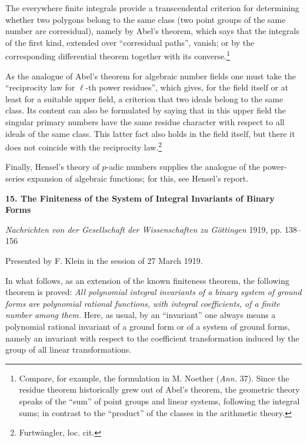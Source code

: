\documentclass[11pt]{article}
\providecommand{\frS}{\mathfrak S}
\begin{document}
The everywhere finite integrals provide a transcendental criterion for determining whether two polygons belong to the same class (two point groups of the same number are corresidual), namely by Abel's theorem, which says that the integrals of the first kind, extended over ``corresidual paths'', vanish; or by the corresponding differential theorem together with its converse.\footnote{Compare, for example, the formulation in M. Noether (\emph{Ann.} 37). Since the residue theorem historically grew out of Abel's theorem, the geometric theory speaks of the ``sum'' of point groups and linear systems, following the integral sums; in contrast to the ``product'' of the classes in the arithmetic theory.}

As the analogue of Abel's theorem for algebraic number fields one must take the ``reciprocity law for \(\ell\)-th power residues'', which gives, for the field itself or at least for a suitable upper field, a criterion that two ideals belong to the same class. Its content can also be formulated by saying that in this upper field the singular primary numbers have the same residue character with respect to all ideals of the same class. This latter fact also holds in the field itself, but there it does not coincide with the reciprocity law.\footnote{Furtwängler, loc. cit.}

Finally, Hensel's theory of \(p\)-adic numbers supplies the analogue of the power-series expansion of algebraic functions; for this, see Hensel's report.


\providecommand{\frH}{\mathfrak H}
\providecommand{\frK}{\mathfrak K}
\providecommand{\frM}{\mathfrak M}
\providecommand{\frN}{\mathfrak N}
\providecommand{\frG}{\mathfrak G}
\providecommand{\frS}{\mathfrak S}
\providecommand{\tmod}[1]{\;(\operatorname{mod} #1)}

\clearpage
\begin{center}
{\Large\bfseries 15. The Finiteness of the System of Integral Invariants of Binary Forms}\par
\vspace{1em}
\emph{Nachrichten von der Gesellschaft der Wissenschaften zu Göttingen} 1919, pp. 138--156
\end{center}

\vspace{2em}
\begin{center}
Presented by F. Klein in the session of 27 March 1919.
\end{center}

In what follows, as an extension of the known finiteness theorem, the following theorem is proved:
\emph{All polynomial integral invariants of a binary system of ground forms are polynomial rational functions, with integral coefficients, of a finite number among them.}
Here, as usual, by an ``invariant'' one always means a polynomial rational invariant of a ground form or of a system of ground forms, namely an invariant with respect to the coefficient transformation induced by the group of all linear transformations.
\end{document}
